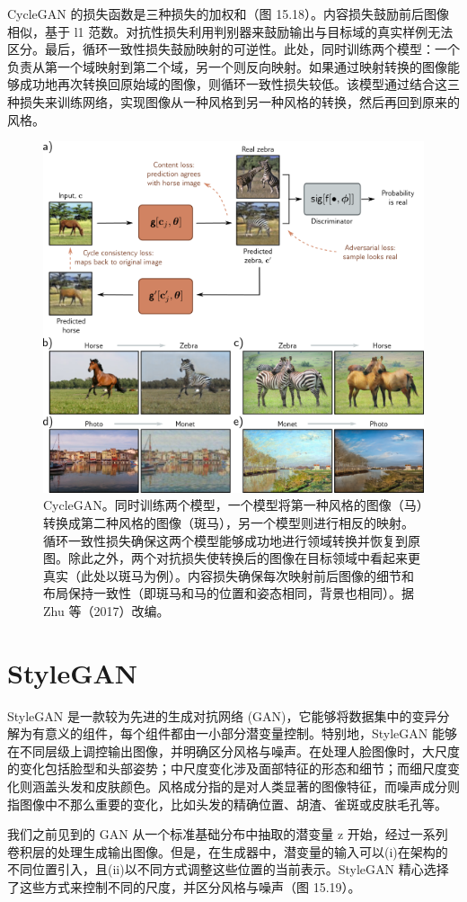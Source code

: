 CycleGAN 的损失函数是三种损失的加权和（图 15.18）。内容损失鼓励前后图像相似，基于 l1 范数。对抗性损失利用判别器来鼓励输出与目标域的真实样例无法区分。最后，循环一致性损失鼓励映射的可逆性。此处，同时训练两个模型：一个负责从第一个域映射到第二个域，另一个则反向映射。如果通过映射转换的图像能够成功地再次转换回原始域的图像，则循环一致性损失较低。该模型通过结合这三种损失来训练网络，实现图像从一种风格到另一种风格的转换，然后再回到原来的风格。

\begin{figure}[ht!]
\centering
\includegraphics[width=0.7\linewidth]{png/chapter15/GANCycleGAN.png}
\caption{CycleGAN。同时训练两个模型，一个模型将第一种风格的图像（马）转换成第二种风格的图像（斑马），另一个模型则进行相反的映射。循环一致性损失确保这两个模型能够成功地进行领域转换并恢复到原图。除此之外，两个对抗损失使转换后的图像在目标领域中看起来更真实（此处以斑马为例）。内容损失确保每次映射前后图像的细节和布局保持一致性（即斑马和马的位置和姿态相同，背景也相同）。据 Zhu 等（2017）改编。}
\end{figure}


\section{StyleGAN}
StyleGAN 是一款较为先进的生成对抗网络 (GAN)，它能够将数据集中的变异分解为有意义的组件，每个组件都由一小部分潜变量控制。特别地，StyleGAN 能够在不同层级上调控输出图像，并明确区分风格与噪声。在处理人脸图像时，大尺度的变化包括脸型和头部姿势；中尺度变化涉及面部特征的形态和细节；而细尺度变化则涵盖头发和皮肤颜色。风格成分指的是对人类显著的图像特征，而噪声成分则指图像中不那么重要的变化，比如头发的精确位置、胡渣、雀斑或皮肤毛孔等。

我们之前见到的 GAN 从一个标准基础分布中抽取的潜变量 z 开始，经过一系列卷积层的处理生成输出图像。但是，在生成器中，潜变量的输入可以(i)在架构的不同位置引入，且(ii)以不同方式调整这些位置的当前表示。StyleGAN 精心选择了这些方式来控制不同的尺度，并区分风格与噪声（图 15.19）。


